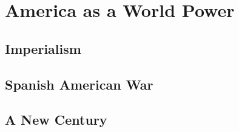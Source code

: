 \chapter{America as a World Power}

\section{Imperialism}

\section{Spanish American War}

\section{A New Century}
